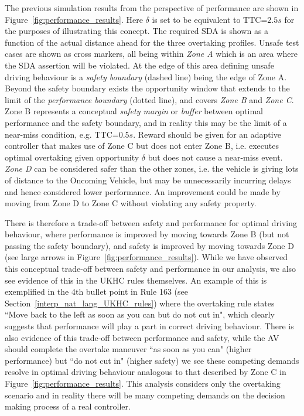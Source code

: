 The previous simulation results from the perspective of performance are shown in Figure~\ref{fig:performance_results}. 
%
Here $\delta$ is set to be equivalent to TTC=$2.5s$ \cite{Robbins2018,Chen2015,wang2019analysis} for the purposes of illustrating this concept. 
%
The required SDA is shown as a function of the actual distance ahead for the three overtaking profiles. Unsafe test cases are shown as cross markers, all being within \emph{Zone A} which is an area where the SDA assertion will be violated. 
%
At the edge of this area defining unsafe driving behaviour is a \emph{safety boundary} (dashed line) being the edge of Zone A. 
%
Beyond the safety boundary exists the opportunity window that extends to the limit of the \emph{performance boundary} (dotted line), and covers \emph{Zone B} and \emph{Zone C}. 
%
Zone B represents a conceptual \emph{safety margin} or \emph{buffer} between optimal performance and the safety boundary, and in reality this may be the limit of a near-miss condition, e.g. TTC=$0.5s$. 
%
Reward should be given for an adaptive controller that makes use of Zone C but does not enter Zone B, i.e. executes optimal overtaking given opportunity $\delta$ but does not cause a near-miss event. 
%
\emph{Zone D} can be considered safer than the other zones, i.e. the vehicle is giving lots of distance to the Oncoming Vehicle, but may be unnecessarily incurring delays and hence considered lower performance. An improvement could be made by moving from Zone D to Zone C without violating any safety property. 

There is therefore a trade-off between safety and performance for optimal driving behaviour, where performance is improved by moving towards Zone B (but not passing the safety boundary), and safety is improved by moving towards Zone D (see large arrows in Figure~\ref{fig:performance_results}). 
%
While we have observed this conceptual trade-off between safety and performance in our analysis, we also see evidence of this in the UKHC rules themselves. An example of this is exemplified in the 4th bullet point in Rule 163 (see Section~\ref{interp_nat_lang_UKHC_rules}) where the overtaking rule states ``Move back to the left as soon as you can but do not cut in", which clearly suggests that performance will play a part in correct driving behaviour. There is also evidence of this trade-off between performance and safety, while the AV should complete the overtake maneuver ``as soon as you can" (higher performance) but ``do not cut in" (higher safety) we see these competing demands resolve in optimal driving behaviour analogous to that described by Zone C in Figure~\ref{fig:performance_results}. 
%
This analysis considers only the overtaking scenario and in reality there will be many competing demands on the decision making process of a real controller. 

